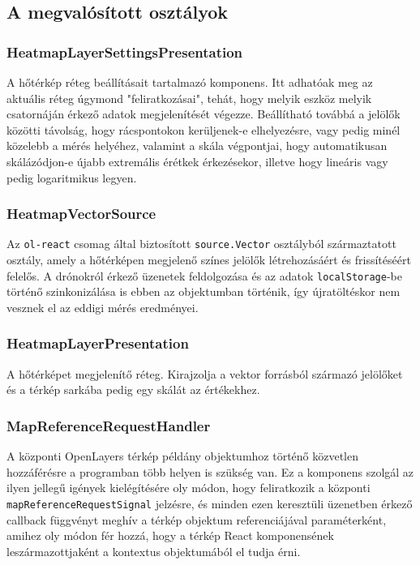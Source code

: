 \subsection{A megvalósított osztályok}

\subsubsection{HeatmapLayerSettingsPresentation}
A hőtérkép réteg beállításait tartalmazó komponens.
Itt adhatóak meg az aktuális réteg úgymond "feliratkozásai", tehát, hogy melyik
eszköz melyik csatornáján érkező adatok megjelenítését végezze.
Beállítható továbbá a jelölők közötti távolság, hogy rácspontokon kerüljenek-e
elhelyezésre, vagy pedig minél közelebb a mérés helyéhez, valamint a skála
végpontjai, hogy automatikusan skálázódjon-e újabb extremális érétkek
érkezésekor, illetve hogy lineáris vagy pedig logaritmikus legyen.

\subsubsection{HeatmapVectorSource}
Az \verb|ol-react| csomag által biztosított \verb|source.Vector| osztályból
származtatott osztály, amely a hőtérképen megjelenő színes jelölők
létrehozásáért és frissítéséért felelős.
A drónokról érkező üzenetek feldolgozása és az adatok \verb|localStorage|-be
történő szinkonizálása is ebben az objektumban történik, így újratöltéskor nem
vesznek el az eddigi mérés eredményei.

\subsubsection{HeatmapLayerPresentation}
A hőtérképet megjelenítő réteg. Kirajzolja a vektor forrásból származó jelölőket
és a térkép sarkába pedig egy skálát az értékekhez.

\subsubsection{MapReferenceRequestHandler}
A központi OpenLayers térkép példány objektumhoz történő közvetlen hozzáférésre
a programban több helyen is szükség van. Ez a komponens szolgál az ilyen jellegű
igények kielégítésére oly módon, hogy feliratkozik a központi
\verb|mapReferenceRequestSignal| jelzésre, és minden ezen keresztüli üzenetben
érkező callback függvényt meghív a térkép objektum referenciájával
paraméterként, amihez oly módon fér hozzá, hogy a térkép React komponensének
leszármazottjaként a kontextus objektumából el tudja érni.

